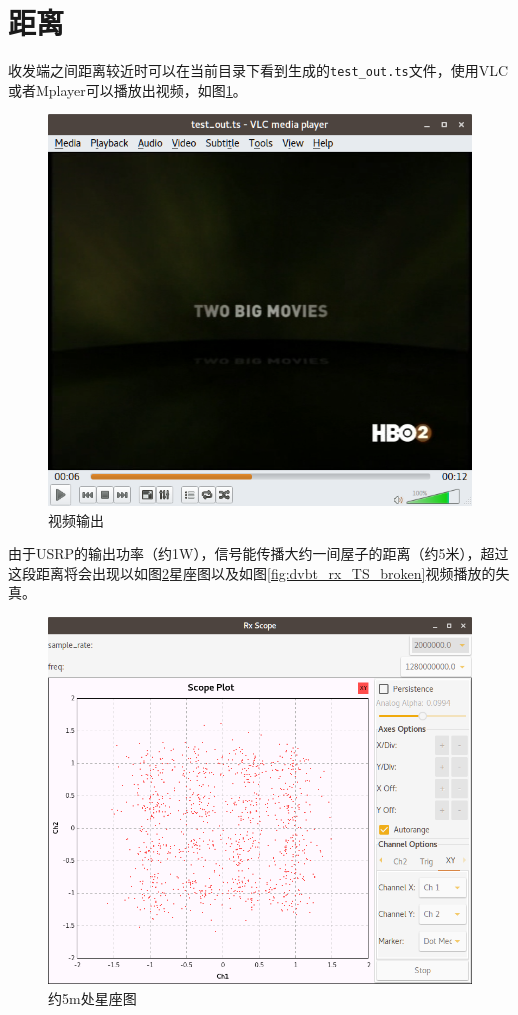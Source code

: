 	\section{距离}
		\par 收发端之间距离较近时可以在当前目录下看到生成的\lstinline[language=sh]{test_out.ts}文件，使用VLC或者Mplayer可以播放出视频，如图\ref{fig:dvbt_rx_TS}。
		\begin{figure}[htp]
			\centering
			\includegraphics[width=13cm]{figures/dvbt_rx_TS.png}
			\caption{视频输出}
			\label{fig:dvbt_rx_TS}
		\end{figure}
		\par 由于USRP的输出功率（约1W），信号能传播大约一间屋子的距离（约5米），超过这段距离将会出现以如图\ref{fig:dvbt_rx_2MHz_ranged_2}星座图以及如图\ref{fig:dvbt_rx_TS_broken}视频播放的失真。
		\begin{figure}[htp]
			\centering
			\includegraphics[width=13cm]{figures/dvbt_rx_2MHz_ranged_2.png}
			\caption{约5m处星座图}
			\label{fig:dvbt_rx_2MHz_ranged_2}
		\end{figure}
